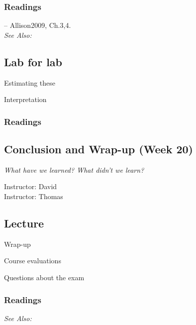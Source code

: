 \documentclass[11pt,a4paper]{article}
\newcommand{\textbook}[2][]{\noindent -- {#2}, {#1}.\vspace{.25em}\\}
\newcommand{\thomas}{\vspace{1em}\noindent Instructor: Thomas\vspace{1em}\\}
\newcommand{\david}{\vspace{1em}\noindent Instructor: David\vspace{1em}\\}
\newcommand{\seealso}{\noindent \emph{See Also:}\\}
\begin{document}
\subsubsection*{Readings}
\textbook[Ch.3,4]{Allison2009}

\seealso


\subsection*{Lab for lab}

\begin{itemize*}
\item Estimating these
\item Interpretation
\end{itemize*}

\subsubsection*{Readings}




\clearpage
\subsection{Conclusion and Wrap-up (Week 20)} %
\emph{What have we learned? What didn't we learn?}

\david
\thomas

\vspace{1em}
\subsection*{Lecture}
\begin{itemize*}
\item Wrap-up
\item Course evaluations
\item Questions about the exam
\end{itemize*}

\subsubsection*{Readings}

\seealso






\end{document}
